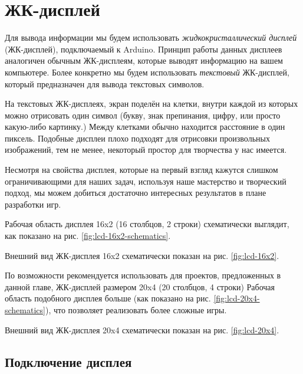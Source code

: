 \documentclass[../sparc.tex]{subfiles}
\begin{document}
\section{ЖК-дисплей}

Для вывода информации мы будем использовать \emph{жидкокристаллический дисплей}
(ЖК-дисплей), подключаемый к Arduino.  Принцип работы данных дисплеев аналогичен
обычным ЖК-дисплеям, которые выводят информацию на вашем компьютере.  Более
конкретно мы будем использовать \emph{текстовый} ЖК-дисплей, который
предназначен для вывода текстовых символов.

На текстовых ЖК-дисплеях, экран поделён на клетки, внутри каждой из которых
можно отрисовать один символ (букву, знак препинания, цифру, или просто
какую-либо картинку.)  Между клетками обычно находится расстояние в один
пиксель.  Подобные дисплеи плохо подходят для отрисовки произвольных
изображений, тем не менее, некоторый простор для творчества у нас имеется.

Несмотря на свойства дисплея, которые на первый взгляд кажутся слишком
ограничивающими для наших задач, используя наше мастерство и творческий подход,
мы можем добиться достаточно интересных результатов в плане разработки игр.

Рабочая область дисплея 16x2 (16 столбцов, 2 строки) схематически выглядит, как
показано на рис. \ref{fig:lcd-16x2-schematics}.


Внешний вид ЖК-дисплея 16x2 схематически показан на рис. \ref{fig:lcd-16x2}.


По возможности рекомендуется использовать для проектов, предложенных в данной
главе, ЖК-дисплей размером 20x4 (20 столбцов, 4 строки) Рабочая область
подобного дисплея больше (как показано на рис. \ref{fig:lcd-20x4-schematics}),
что позволяет реализовать более сложные игры.


Внешний вид ЖК-дисплея 20x4 схематически показан на рис. \ref{fig:lcd-20x4}.


\subsection{Подключение дисплея}
\end{document}
